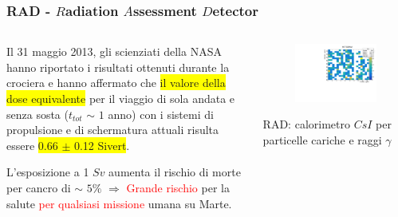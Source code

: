 \begin{frame} [fragile]
	\frametitle{RAD - $R$adiation $A$ssessment $D$etector}
	\begin{columns}
  		\begin{column}{0.50\textwidth}
			Il 31 maggio 2013, gli scienziati della NASA hanno riportato i risultati ottenuti durante la crociera e hanno affermato che \colorbox{yellow}{il valore della dose equivalente} per il viaggio di sola andata e senza sosta ($t_{tot}$ $\sim$ $1$ anno) con i sistemi di propulsione e di schermatura attuali risulta essere  \colorbox{yellow}{0.66 $\pm$ 0.12 Sivert}. 
			\newline

			L'esposizione a 1 $Sv$ aumenta il rischio di morte per cancro di $\sim$ $5$$\%$ $\Longrightarrow$ \textcolor{red}{Grande rischio} per la salute \newline
			\textcolor{red}{per qualsiasi missione} umana su Marte. 
		\end{column}
    \begin{column}{0.50\textwidth}
 		\newline
			\begin{figure}
	  		\centering
				\includegraphics[scale=0.20]{figures/0.20.pdf}
				\end{figure}
			\begin{block}{}
				RAD: calorimetro $CsI$ per particelle cariche e raggi $\gamma$
			\end{block}
    \end{column}
\end{columns}
\end{frame}